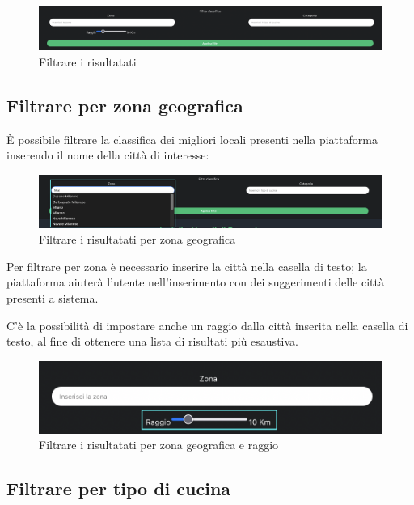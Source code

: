 \begin{figure}[H]
\centering
\includegraphics[scale=0.3]{./images/Homepage/Filtri.png} 
\caption{Filtrare i risultatati}
\end{figure}

\subsection{Filtrare per zona geografica}

È possibile filtrare la classifica dei migliori locali presenti nella piattaforma inserendo il nome della città di interesse:

\begin{figure}[H]
\centering
\includegraphics[scale=0.2]{./images/Homepage/FiltriZona.png} 
\caption{Filtrare i risultatati per zona geografica}
\end{figure}

Per filtrare per zona è necessario inserire la città nella casella di testo; la piattaforma aiuterà l'utente nell'inserimento con dei suggerimenti delle città presenti a sistema.

C'è la possibilità di impostare anche un raggio dalla città inserita nella casella di testo, al fine di ottenere una lista di risultati più esaustiva.

\begin{figure}[H]
\centering
\includegraphics[scale=0.4]{./images/Homepage/Raggio.png} 
\caption{Filtrare i risultatati per zona geografica e raggio}
\end{figure}

\subsection{Filtrare per tipo di cucina}

